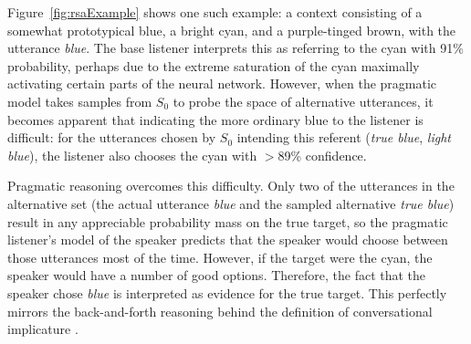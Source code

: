 \documentclass[11pt,letterpaper]{article}
\newcommand{\Speaker}{S}
\renewcommand{\|}{\mid}
\newcommand{\Figref}[1]{Figure~\ref{#1}}
\begin{document}
\Figref{fig:rsaExample}
shows one such example: a context consisting of a somewhat prototypical blue,
a bright cyan, and a purple-tinged brown, with the utterance \textit{blue}. The
base listener interprets this as referring to the cyan with 91\% probability,
perhaps due to the extreme saturation of the cyan maximally activating certain
parts of the neural network. However, when the pragmatic model takes samples
from $\Speaker_0$ to probe the space of alternative utterances, it becomes
apparent that indicating the more ordinary blue to the listener is difficult:
for the utterances chosen by $\Speaker_0$ intending this referent (\textit{true blue},
\textit{light blue}), the listener also
chooses the cyan with $>$89\% confidence.

Pragmatic reasoning overcomes this difficulty. Only two of the utterances in the
alternative set (the actual utterance \textit{blue} and the sampled alternative
\textit{true blue}) result in any appreciable probability mass on the true target,
so the pragmatic listener's model of the speaker predicts that the speaker
would choose between those utterances most of the time. However, if the target
were the cyan, the speaker would have a number of good options. Therefore, the
fact that the speaker chose \textit{blue} is interpreted as evidence for the
true target. This perfectly mirrors the back-and-forth reasoning behind the
definition of conversational implicature \cite{Grice75}.
\end{document}
